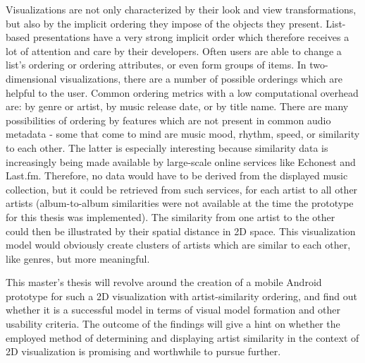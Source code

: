 Visualizations are not only characterized by their look and view transformations, but also by the implicit ordering they impose of the objects they present. List-based presentations have a very strong implicit order which therefore receives a lot of attention and care by their developers. Often users are able to change a list's ordering or ordering attributes, or even form groups of items. In two-dimensional visualizations, there are a number of possible orderings which are helpful to the user. Common ordering metrics with a low computational overhead are: by genre or artist, by music release date, or by title name. There are many possibilities of ordering by features which are not present in common audio metadata - some that come to mind are music mood, rhythm, speed, or similarity to each other. The latter is especially interesting because similarity data is increasingly being made available by large-scale online services like Echonest and Last.fm. Therefore, no data would have to be derived from the displayed music collection, but it could be retrieved from such services, for each artist to all other artists (album-to-album similarities were not available at the time the prototype for this thesis was implemented). The similarity from one artist to the other could then be illustrated by their spatial distance in 2D space. This visualization model would obviously create clusters of artists which are similar to each other, like genres, but more meaningful. 

This master's thesis will revolve around the creation of a mobile Android prototype for such a 2D visualization with artist-similarity ordering, and find out whether it is a successful model in terms of visual model formation and other usability criteria. The outcome of the findings will give a hint on whether the employed method of determining and displaying artist similarity in the context of 2D visualization is promising and worthwhile to pursue further.